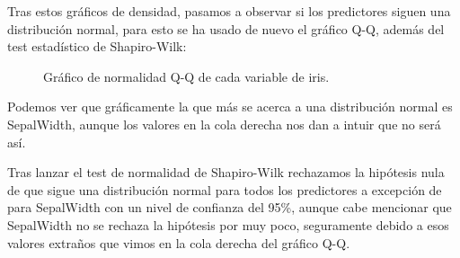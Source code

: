 Tras estos gráficos de densidad, pasamos a observar si los predictores siguen una distribución normal, para esto se ha usado de nuevo el gráfico Q-Q, además del test estadístico de Shapiro-Wilk:

\begin{figure}[H]
	\centering
	
	\caption{Gráfico de normalidad Q-Q de cada variable de iris.}
	\label{fig:qqplot_iris}
\end{figure}


Podemos ver que gráficamente la que más se acerca a una distribución normal es SepalWidth, aunque los valores en la cola derecha nos dan a intuir que no será así.

Tras lanzar el test de normalidad de Shapiro-Wilk rechazamos la hipótesis nula de que sigue una distribución normal para todos los predictores a excepción de para SepalWidth con un nivel de confianza del 95\%, aunque cabe mencionar que SepalWidth no se rechaza la hipótesis por muy poco, seguramente debido a esos valores extraños que vimos en la cola derecha del gráfico Q-Q.
